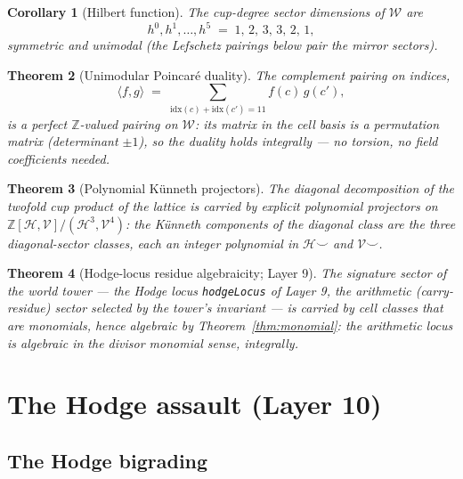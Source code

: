 \documentclass[11pt,a4paper]{article}
\theoremstyle{plain}
\newtheorem{theorem}{Theorem}[section]
\newtheorem{corollary}[theorem]{Corollary}
\theoremstyle{definition}
\newcommand{\Z}{\mathbb{Z}}
\newcommand{\HC}{\mathcal{H}}
\newcommand{\VV}{\mathcal{V}}
\newcommand{\cupop}{\smile}
\begin{document}
\begin{corollary}[Hilbert function]\label{cor:hilbert}
The cup-degree sector dimensions of $\mathcal{W}$ are
\[
  h^{0},h^{1},\dots,h^{5} \;=\; 1,\,2,\,3,\,3,\,2,\,1,
\]
symmetric and unimodal (the Lefschetz pairings below pair the mirror sectors).
\end{corollary}

\begin{theorem}[Unimodular Poincar\'e duality]\label{thm:poincare}
The complement pairing on indices,
\[
  \langle f, g\rangle \;=\; \sum_{\mathrm{idx}(c) + \mathrm{idx}(c') = 11}
  f(c)\, g(c'),
\]
is a perfect $\Z$-valued pairing on $\mathcal{W}$: its matrix in the cell
basis is a permutation matrix (determinant $\pm1$), so the duality holds
integrally --- no torsion, no field coefficients needed.
\end{theorem}

\begin{theorem}[Polynomial K\"unneth projectors]\label{thm:kunneth}
The diagonal decomposition of the twofold cup product of the lattice is
carried by explicit polynomial projectors on $\Z[\HC,\VV]/(\HC^{3},\VV^{4})$:
the K\"unneth components of the diagonal class are the three diagonal-sector
classes, each an integer polynomial in $\HC\cupop$ and $\VV\cupop$.
\end{theorem}

\begin{theorem}[Hodge-locus residue algebraicity; Layer 9]\label{thm:hodgelocus}
The signature sector of the world tower --- the \emph{Hodge locus}
\texttt{hodgeLocus} of Layer 9, the arithmetic (carry-residue) sector
selected by the tower's invariant --- is carried by cell classes that are
monomials, hence algebraic by Theorem~\ref{thm:monomial}: the arithmetic
locus is algebraic in the divisor monomial sense, integrally.
\end{theorem}

\section{The Hodge assault (Layer 10)}\label{sec:assault}

\subsection{The Hodge bigrading}
\end{document}
